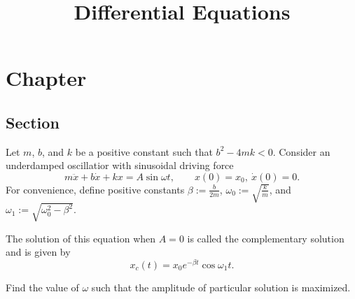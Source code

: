 \documentclass{../prb}
\title{Differential Equations}
\begin{document}
\maketitle
\tableofcontents


\chapter{Chapter}
\section{Section}



\begin{prb}
Let $m$, $b$, and $k$ be a positive constant such that $b^2-4mk<0$.
Consider an underdamped oscillatior with sinusoidal driving force
\[m\ddot x+b\dot x+kx=A\sin\omega t,\qquad x(0)=x_0,\ \dot x(0)=0.\]
For convenience, define positive constants $\beta:=\frac b{2m}$, $\omega_0:=\sqrt{\frac km}$, and $\omega_1:=\sqrt{\omega_0^2-\beta^2}$.

The solution of this equation when $A=0$ is called the complementary solution and is given by
\[x_c(t)=x_0e^{-\beta t}\cos\omega_1t.\]
\begin{cond}
\item
\item Find the value of $\omega$ such that the amplitude of particular solution is maximized.
\end{cond}
\end{prb}
\end{document}
